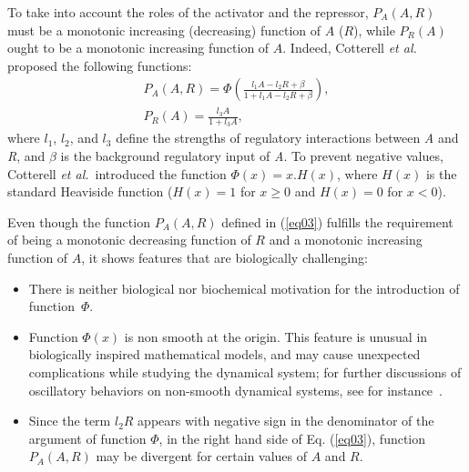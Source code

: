 \documentclass[%
 preprint,
 amsmath,amssymb,
 aps,
]{revtex4-2}
\begin{document}
	To take into account the roles of the activator and the repressor, $P_A(A, R)$
	must be a monotonic increasing (decreasing) function of $A$ ($R$), while
	$P_R(A)$ ought to be a monotonic increasing function of $A$. Indeed,
	Cotterell {\em et al.}~\citep{Cotterell2015} proposed the following functions:
	\begin{subequations}\label{eq034}
		\begin{gather}
		P_A(A, R) = \displaystyle \Phi \left(
		\frac{l_1 A - l_2 R + \beta}{1 + l_1 A - l_2 R + \beta}
		\right), \label{eq03} \\[3mm]
		P_R(A) = \displaystyle \frac{l_3 A}{1 + l_3 A}, \label{eq04}
		\end{gather}
	\end{subequations}
	where $l_1$, $l_2$, and $l_3$ define the strengths of regulatory interactions
	between \textit{A} and \textit{R}, and $\beta$ is the background regulatory
	input of \textit{A}. To prevent negative values, Cotterell {\em et al.}~introduced the function $\Phi(x) = x.H(x)$, where $H(x)$ is the standard
	Heaviside function ($H(x) = 1$ for $x \geq 0$ and $H(x) = 0$ for $x < 0$).
	
	Even though the function $P_A(A, R)$ defined in (\ref{eq03}) fulfills the
	requirement of being a monotonic decreasing function of $R$ and a monotonic
	increasing function of $A$, it shows features that are biologically challenging:
	\begin{itemize}
		\item There is neither biological nor biochemical motivation for the introduction of function~$\Phi$.
		\item Function $\Phi(x)$ is non smooth at the origin. This feature is
		unusual in biologically inspired mathematical models, and may cause unexpected
		complications while studying the dynamical system; for further discussions of oscillatory behaviors on non-smooth dynamical systems, see for instance~\cite{han01,castillo01}.
		\item Since the term $l_2 R$ appears with negative sign in the denominator of
		the argument of function $\Phi$, in the right hand side of Eq. (\ref{eq03}),
		function $P_A(A, R)$ may be divergent for certain values of $A$ and $R$.
	\end{itemize}
	
\end{document}
